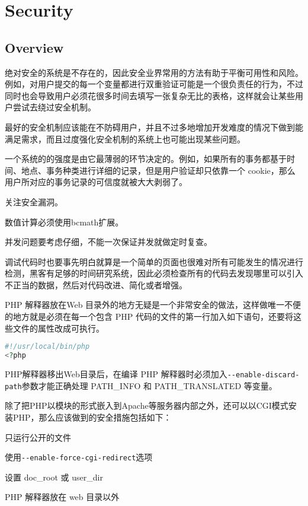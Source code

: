 \part{Security}


\chapter{Overview}


绝对安全的系统是不存在的，因此安全业界常用的方法有助于平衡可用性和风险。例如，对用户提交的每一个变量都进行双重验证可能是一个很负责任的行为，不过同时也会导致用户必须花很多时间去填写一张复杂无比的表格，这样就会让某些用户尝试去绕过安全机制。



最好的安全机制应该能在不防碍用户，并且不过多地增加开发难度的情况下做到能满足需求，而且过度强化安全机制的系统上也可能出现某些问题。

一个系统的的强度是由它最薄弱的环节决定的。例如，如果所有的事务都基于时间、地点、事务种类进行详细的记录，但是用户验证却只依靠一个 cookie，那么用户所对应的事务记录的可信度就被大大剥弱了。

\begin{compactitem}
\item 关注安全漏洞。
\item 数值计算必须使用bcmath扩展。
\item 并发问题要考虑仔细，不能一次保证并发就做定时复查。
\end{compactitem}

调试代码时也要事先明白就算是一个简单的页面也很难对所有可能发生的情况进行检测，黑客有足够的时间研究系统，因此必须检查所有的代码去发现哪里可以引入不正当的数据，然后对代码改进、简化或者增强。

PHP 解释器放在Web 目录外的地方无疑是一个非常安全的做法，这样做唯一不便的地方就是必须在每一个包含 PHP 代码的文件的第一行加入如下语句，还要将这些文件的属性改成可执行。

\begin{lstlisting}[language=PHP]
#!/usr/local/bin/php
<?php
\end{lstlisting}

PHP解释器移出Web目录后，在编译 PHP 解释器时必须加入\texttt{-\/-enable-discard-path}参数才能正确处理 PATH\_INFO 和 PATH\_TRANSLATED 等变量。


除了把PHP以模块的形式嵌入到Apache等服务器内部之外，还可以以CGI模式安装PHP，那么应该做到的安全措施包括如下：

\begin{compactitem}
\item 只运行公开的文件
\item 使用\texttt{-\/-enable-force-cgi-redirect}选项
\item 设置 doc\_root 或 user\_dir
\item PHP 解释器放在 web 目录以外
\end{compactitem}

